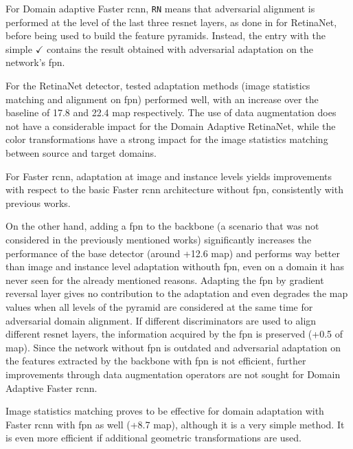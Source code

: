\documentclass[%
    corpo=12pt,
    twoside,
    stile=classica,   
    tipotesi=magistrale,
    evenboxes,
    english,
	numerazioneromana,
]{toptesi}
\begin{document}
For Domain adaptive Faster \gls{rcnn}, \texttt{RN} means that adversarial alignment is performed at the level of the last three \gls{resnet} layers, as done in \cite{pasqualino2020unsupervised} for RetinaNet, before being used to build the feature pyramids. Instead, the entry with the simple $\checkmark$ contains the result obtained with adversarial adaptation on the network's \gls{fpn}.

\bigskip
For the RetinaNet detector, tested adaptation methods (image statistics matching and alignment on \gls{fpn}) performed well, with an increase over the baseline of 17.8 and 22.4 \gls{map} respectively. The use of data augmentation does not have a considerable impact for the Domain Adaptive RetinaNet, while the color transformations have a strong impact for the image statistics matching between source and target domains.

\bigskip
For Faster \gls{rcnn}, adaptation at image and instance levels yields improvements with respect to the basic Faster \gls{rcnn} architecture without \gls{fpn}, consistently with previous works\cite{abramov2020simple}\cite{chen2018domain}\cite{saito2019strongweak}.

\medskip
On the other hand, adding a \gls{fpn} to the backbone (a scenario that was not considered in the previously mentioned works) significantly increases the performance of the base detector (around +12.6 \acrshort{map}) and performs way better than image and instance level adaptation withouth \gls{fpn}, even on a domain it has never seen for the already mentioned reasons. Adapting the \gls{fpn} by gradient reversal layer gives no contribution to the adaptation and even degrades the \gls{map} values when all levels of the pyramid are considered at the same time for adversarial domain alignment. If different discriminators are used to align different \gls{resnet} layers, the information acquired by the \gls{fpn} is preserved (+0.5 of \gls{map}). Since the network without \gls{fpn} is outdated and adversarial adaptation on the features extracted by the backbone with \gls{fpn} is not efficient, further improvements through data augmentation operators are not sought for Domain Adaptive Faster \gls{rcnn}.

\medskip
Image statistics matching proves to be effective for domain adaptation with Faster \gls{rcnn} with \gls{fpn} as well (+8.7 \gls{map}), although it is a very simple method. It is even more efficient if additional geometric transformations are used.
\end{document}
